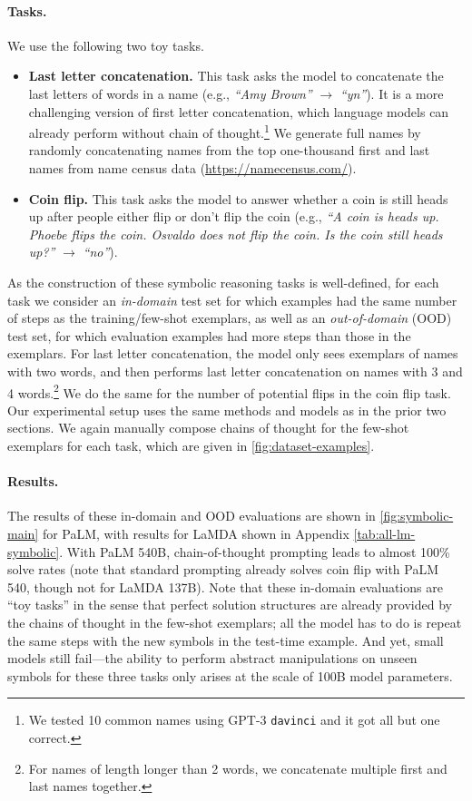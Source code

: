 \documentclass[]{article}
\theoremstyle{plain}
\theoremstyle{definition}
\theoremstyle{remark}
\newcommand{\lamda}[0]{LaMDA}
\newcommand{\palm}[0]{PaLM}
\begin{document}
\paragraph{Tasks.}
We use the following two toy tasks.
\begin{itemize}[leftmargin=*,topsep=0pt]
    \itemsep0em 
    \item \textbf{Last letter concatenation.}
    This task asks the model to concatenate the last letters of words in a name (e.g., \textit{``Amy Brown''} $\rightarrow$ \textit{``yn''}). 
    It is a more challenging version of first letter concatenation, which language models can already perform without chain of thought.\footnote{We tested 10 common names using GPT-3 \texttt{davinci} and it got all but one correct.}
    We generate full names by randomly concatenating names from the top one-thousand first and last names from name census data ({\small{\url{https://namecensus.com/}}}).
    \item \textbf{Coin flip.}
    This task asks the model to answer whether a coin is still heads up after people either flip or don't flip the coin (e.g., \textit{``A coin is heads up. Phoebe flips the coin. Osvaldo does not flip the coin. Is the coin still heads up?''} $\rightarrow$ \textit{``no''}).
\end{itemize}

As the construction of these symbolic reasoning tasks is well-defined, for each task we consider an \textit{in-domain} test set for which examples had the same number of steps as the training/few-shot exemplars, as well as an \textit{out-of-domain} (OOD) test set, for which evaluation examples had more steps than those in the exemplars. 
For last letter concatenation, the model only sees exemplars of names with two words, and then performs last letter concatenation on names with 3 and 4 words.\footnote{For names of length longer than 2 words, we concatenate multiple first and last names together.}
We do the same for the number of potential flips in the coin flip task. 
Our experimental setup uses the same methods and models as in the prior two sections.
We again manually compose chains of thought for the few-shot exemplars for each task, which are given in \cref{fig:dataset-examples}.

\paragraph{Results.}
The results of these in-domain and OOD evaluations are shown in \cref{fig:symbolic-main} for \palm{}, with results for \lamda{} shown in Appendix \cref{tab:all-lm-symbolic}.
With \palm{} 540B, chain-of-thought prompting leads to almost 100\% solve rates (note that standard prompting already solves coin flip with \palm{} 540, though not for \lamda{} 137B).
Note that these in-domain evaluations are ``toy tasks'' in the sense that perfect solution structures are already provided by the chains of thought in the few-shot exemplars; all the model has to do is repeat the same steps with the new symbols in the test-time example.
And yet, small models still fail---the ability to perform abstract manipulations on unseen symbols for these three tasks only arises at the scale of 100B model parameters.
\end{document}

